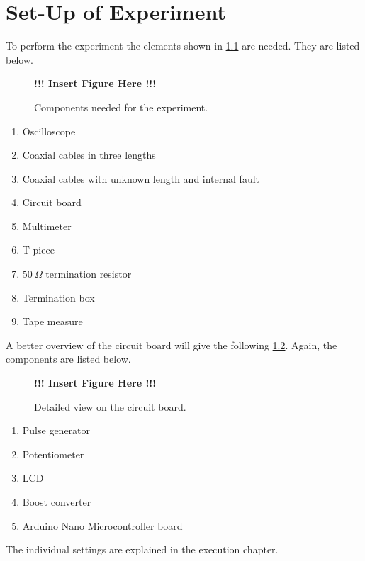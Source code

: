 \chapter{Set-Up of Experiment}
    To perform the experiment the elements shown in \cref{fig:setup} are needed. They are listed below.
    \begin{figure}[H]
        \centering
        \begin{framed}
            \textbf{!!! Insert Figure Here !!!}
        \end{framed}
        \caption{Components needed for the experiment.}  
        \label{fig:setup}
    \end{figure}
    \begin{enumerate}
        \item Oscilloscope
        \item Coaxial cables in three lengths
        \item Coaxial cables with unknown length and internal fault
        \item Circuit board
        \item Multimeter
        \item T-piece
        \item $50\ \Omega$ termination resistor
        \item Termination box
        \item Tape measure
    \end{enumerate}
    A better overview of the circuit board will give the following \cref{fig:circuit_board}. Again, the components are listed
    below.
    \begin{figure}[H]
        \centering
        \begin{framed}
            \textbf{!!! Insert Figure Here !!!}
        \end{framed}
        \caption{Detailed view on the circuit board.}  
        \label{fig:circuit_board}
    \end{figure}
    \begin{enumerate}
        \item Pulse generator
        \item Potentiometer
        \item LCD
        \item Boost converter
        \item Arduino Nano Microcontroller board
    \end{enumerate}
    The individual settings are explained in the execution chapter.